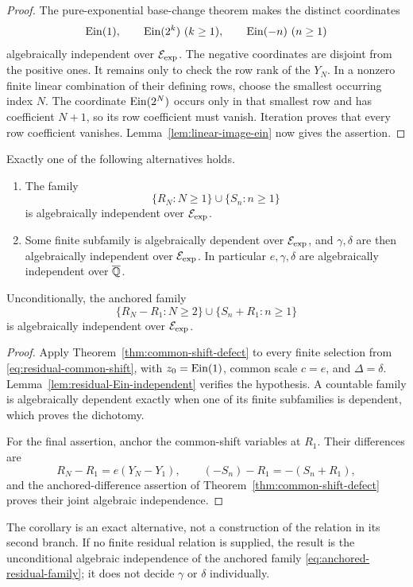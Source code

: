 \begin{proof}
The pure-exponential base-change theorem makes the distinct coordinates
\[
 \operatorname{Ein}(1),\qquad \operatorname{Ein}(2^k)\ (k\geq1),\qquad \operatorname{Ein}(-n)\ (n\geq1)
\]
algebraically independent over \(\mathcal E_{\mathrm{exp}}\).  The negative coordinates are
disjoint from the positive ones.  It remains only to check the row rank of
the \(Y_N\).  In a nonzero finite linear combination of their defining
rows, choose the smallest occurring index \(N\).  The coordinate
\(\operatorname{Ein}(2^N)\) occurs only in that smallest row and has coefficient \(N+1\),
so its row coefficient must vanish.  Iteration proves that every row
coefficient vanishes.  Lemma~\ref{lem:linear-image-ein} now gives the
assertion.
\end{proof}

\begin{corollary}
\label{cor:countable-residual-dichotomy}
Exactly one of the following alternatives holds.
\begin{enumerate}[label=\textup{(\roman*)}]
 \item The family
 \[
  \{R_N:N\geq1\}\cup\{S_n:n\geq1\}
 \]
 is algebraically independent over \(\mathcal E_{\mathrm{exp}}\).
 \item Some finite subfamily is algebraically dependent over \(\mathcal E_{\mathrm{exp}}\),
 and \(\gamma,\delta\) are then algebraically independent over
 \(\mathcal E_{\mathrm{exp}}\).  In particular \(e,\gamma,\delta\) are algebraically
 independent over \(\overline{\mathbb Q}\).
\end{enumerate}
Unconditionally, the anchored family
\begin{equation}\label{eq:anchored-residual-family}
 \boxed{
 \{R_N-R_1:N\geq2\}\cup\{S_n+R_1:n\geq1\}}
\end{equation}
is algebraically independent over \(\mathcal E_{\mathrm{exp}}\).
\end{corollary}

\begin{proof}
Apply Theorem~\ref{thm:common-shift-defect} to every finite selection from
\eqref{eq:residual-common-shift}, with
\(z_0=\operatorname{Ein}(1)\), common scale \(c=e\), and \(\Delta=\delta\).
Lemma~\ref{lem:residual-Ein-independent} verifies the hypothesis.  A
countable family is algebraically dependent exactly when one of its finite
subfamilies is dependent, which proves the dichotomy.

For the final assertion, anchor the common-shift variables at \(R_1\).  Their
differences are
\[
 R_N-R_1=e(Y_N-Y_1),
 \qquad
 (-S_n)-R_1=-(S_n+R_1),
\]
and the anchored-difference assertion of
Theorem~\ref{thm:common-shift-defect} proves their joint algebraic
independence.
\end{proof}

\begin{remark}
The corollary is an exact alternative, not a construction of the relation in
its second branch.  If no finite residual relation is supplied, the result is
the unconditional algebraic independence of the anchored family
\eqref{eq:anchored-residual-family}; it does not decide \(\gamma\) or
\(\delta\) individually.
\end{remark}
